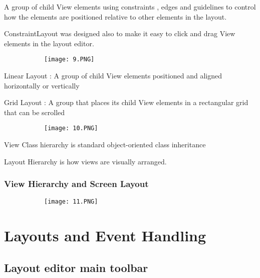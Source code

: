 \documentclass{article}
\begin{document}
A group of child View elements using constraints , edges and guidelines to control how the elements are positioned relative to other elements in the layout.

ConstraintLayout was designed also to make it easy to click and drag View elements in the layout editor.

    \begin{figure}[ht!]
  \centering
  \begin{subfigure}[b]{0.2\linewidth}
    \texttt{[image: 9.PNG]}
  \end{subfigure}
  \end{figure}

  Linear Layout : A group of child View elements positioned and aligned horizontally or vertically

  Grid Layout : A group that places its child View elements in a rectangular grid that can be scrolled
  

      \begin{figure}[ht!]
  \centering
  \begin{subfigure}[b]{0.2\linewidth}
    \texttt{[image: 10.PNG]}
  \end{subfigure}
  \end{figure}



  View Class hierarchy is standard object-oriented class inheritance

  Layout Hierarchy is how views are visually arranged.

\subsubsection{View Hierarchy and Screen Layout}

      \begin{figure}[ht!]
  \centering
  \begin{subfigure}[b]{0.7\linewidth}
    \texttt{[image: 11.PNG]}
  \end{subfigure}
  \end{figure}

\section{Layouts and Event Handling}

\subsection{Layout editor main toolbar}
\end{document}
